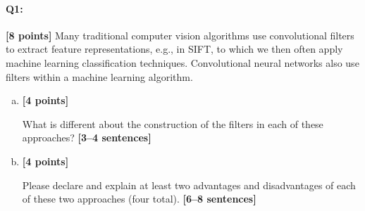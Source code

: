\pagebreak

\paragraph{Q1:} \textbf{[8 points]} Many traditional computer vision algorithms use convolutional filters to extract feature representations, e.g., in SIFT, to which we then often apply machine learning classification techniques. Convolutional neural networks also use filters within a machine learning algorithm.

\begin{enumerate} [(a)]
\item \textbf{[4 points]}

\begin{tcolorbox}[colback=orange!5!white,colframe=orange!75!black]
What is different about the construction of the filters in each of these approaches? \textbf{[3--4 sentences]}
\end{tcolorbox}

\pagebreak
\item \textbf{[4 points]}
\begin{tcolorbox}[colback=orange!5!white,colframe=orange!75!black]
Please declare and explain at least two advantages and disadvantages of each of these two approaches (four total). \textbf{[6--8 sentences]}
\end{tcolorbox}
\end{enumerate}


